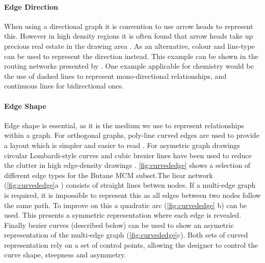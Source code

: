 % 





\paragraph{Edge Direction}
When using a directional graph it is convention to use arrow heads to represent this. However in high density regions it is often found that arrow heads take up precious real estate in the drawing area \citep{noarredge}. As an alternative, colour and line-type can be used to represent the direction instead. This example can be shown in the routing networks presented by \citep{networkrouting}. One example applicable for chemistry would be the use of dashed lines to represent mono-directional relationships, and continuous lines for bidirectional ones. 








\paragraph{Edge Shape}
Edge shape is essential, as it is the medium we use to represent relationships within a graph. For orthogonal graphs, poly-line curved edges are used to provide a layout which is simpler and easier to read \citep{ortho}. For asymetric graph drawings circular Lombardi-style curves and cubic brezier lines have been used to reduce the clutter in high edge-density drawings \citep{lombardi,bezier}. \autoref{fig:curvededge} shows a selection of different edge types for the Butane MCM subset.The liear network (\autoref{fig:curvededge}a ) consists of straight lines betwen nodes. If a multi-edge graph is required, it is impossible to represent this as all edges between two nodes follow the same path. To improve on this a quadratic arc (\autoref{fig:curvededge} b) can be used. This presents a symmetric representation where each edge is revealed. Finally bezier curves (described below) can be used to show an asymetric representation of the multi-edge graph (\autoref{fig:curvededge}c). Both sets of curved representation rely on a set of control points, allowing the designer to control the curve shape, steepness and asymmetry. 

